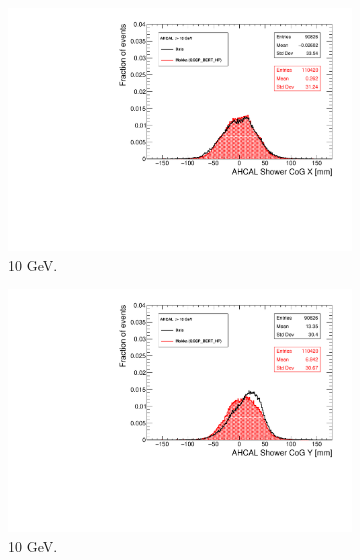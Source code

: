 \begin{figure}[htbp!]
  \centering
  \begin{subfigure}[t]{0.49\textwidth}
    \includegraphics[width=1.\linewidth]{../Thesis_Plots/Timing/Pions/Plots/Run24306_CoGX_AHCAL_10GeV_Comparison.pdf}
    \caption{10 GeV.} \label{fig:pi10GeVX}
  \end{subfigure}
  \hfill
  \begin{subfigure}[t]{0.49\textwidth}
    \includegraphics[width=1.\linewidth]{../Thesis_Plots/Timing/Pions/Plots/Run24306_CoGY_AHCAL_10GeV_Comparison.pdf}
    \caption{10 GeV.} \label{fig:pi10GeVY}
  \end{subfigure}
  \hfill
  \begin{subfigure}[t]{0.49\textwidth}

\end{subfigure}
\end{figure}
